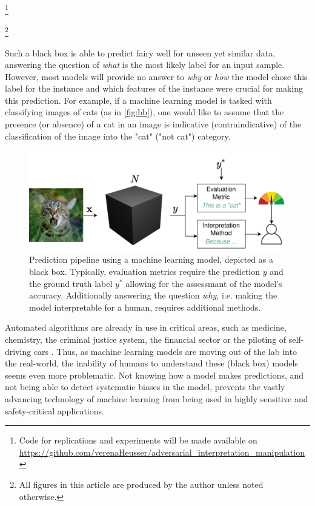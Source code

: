 \documentclass[sigconf]{acmart}
\newcommand\blfootnote[1]{%
  \begingroup
  \renewcommand\thefootnote{}\footnote{#1}%
  \addtocounter{footnote}{-1}%
  \endgroup
}
\begin{document}
\blfootnote{Code for replications and experiments will be made available on \url{https://github.com/verenaHeusser/adversarial_interpretation_manipulation}}
\blfootnote{All figures in this article are produced by the author unless noted otherwise.}

Such a black box is able to predict fairy well for unseen yet similar data, answering the question of \textit{what} is the most likely label for an input sample. However, most models will provide no answer to \textit{why} or \textit{how} the model chose this label for the instance and which features of the instance were crucial for making this prediction. For example, if a machine learning model is tasked with classifying images of cats (as in \autoref{fig:bb}), one would like to assume that the presence (or absence) of a cat in an image is indicative (contraindicative) of the classification of the image into the "cat" ("not cat") category.

\begin{figure}[t]
    \centering
    \includegraphics[width=\linewidth]{figures/bb_cat.png}
    \caption{Prediction pipeline using a machine learning model, depicted as a black box. Typically, evaluation metrics require the prediction $y$ and the ground truth label $y^*$ allowing for the assessmant of the model's accuracy. Additionally answering the question \textit{why}, i.e. making the model interpretable for a human, requires additional methods.}
    \label{fig:bb}
    \vspace{-0.3cm}
\end{figure}

Automated algorithms are already in use in critical areas, such as medicine, chemistry, the criminal justice system, the financial sector or the piloting of self-driving cars \cite{chouldechova2017fair, elshawi2019interpretability, whitmore2016mapping}. %
Thus, as machine learning models are moving out of the lab into the real-world, the inability of humans to understand these (black box) models seems even more problematic. Not knowing how a model makes predictions, and not being able to detect systematic biases in the model, prevents the vastly advancing technology of machine learning from being used in highly sensitive and safety-critical applications.  
\end{document}
